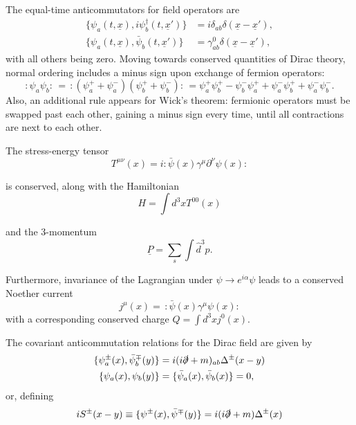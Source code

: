 \documentclass{article}
\numberwithin{equation}{section}
\newcommand{\normord}[1]{:\mathrel{#1}:}
\begin{document}
The equal-time anticommutators for field operators are
\begin{equation}
\begin{aligned}
    \{\psi_a(t, \underline{x}), i\psi_b^\dagger(t, \underline{x}') \}  & = i \delta_{ab} \delta(\underline{x} - \underline{x}'), \\
    \{\psi_a(t, \underline{x}), \bar{\psi}_b(t, \underline{x}')\} &= \gamma_{ab}^0 \delta(\underline{x} - \underline{x}'),
\end{aligned}
\end{equation}
with all others being zero. Moving towards conserved quantities of Dirac theory, normal ordering includes a minus sign upon exchange of fermion operators:
\begin{equation}
    \normord{\psi_a\psi_b}\, = \,\normord{(\psi_a^+ + \psi_a^-)(\psi_b^+ + \psi_b^-)}\,= \psi_a^+ \psi_b^+ - \psi_b^- \psi_a^+ + \psi_a^- \psi_b^+ + \psi_a^- \psi_b^-.
\end{equation}
Also, an additional rule appears for Wick's theorem: fermionic operators must be swapped past each other, gaining a minus sign every time, until all contractions are next to each other. 

The stress-energy tensor 
\begin{equation}
    T^{\mu\nu}(x) = i \normord{\bar{\psi}(x)\gamma^\mu \partial^\nu \psi(x)}
\end{equation}

is conserved, along with the Hamiltonian
\begin{equation}
    H = \int d^3x T^{00}(x)
\end{equation}

and the 3-momentum 
\begin{equation}
    \underline{P} = \sum_s \int \hat{d}^3p.
\end{equation}

Furthermore, invariance of the Lagrangian under $\psi \rightarrow e^{i\alpha}\psi$ leads to a conserved Noether current
\begin{equation}
    j^\mu(x) = \, \normord{\bar{\psi}(x)\gamma^\mu \psi(x)}
\end{equation}
with a corresponding conserved charge $Q = \int d^3x j^0(x)$.

The covariant anticommutation relations for the Dirac field are given by
\begin{equation}
\begin{aligned}
    \{\psi_a^\pm (x), \bar{\psi}_b^\mp (y)\} &= i(i\slashed{\partial} + m)_{ab} \Delta^\pm (x-y) \\
    \{\psi_a(x), \psi_b(y)\} &= \{\bar{\psi}_a(x), \bar{\psi}_b(x)\} = 0,
\end{aligned}
\end{equation}
or, defining
\begin{equation}
    i S^\pm (x-y) \equiv \{\psi^\pm(x), \bar{\psi}^\mp(y) \} = i(i\slashed{\partial} + m)\Delta^\pm(x)
\end{equation}
\end{document}
